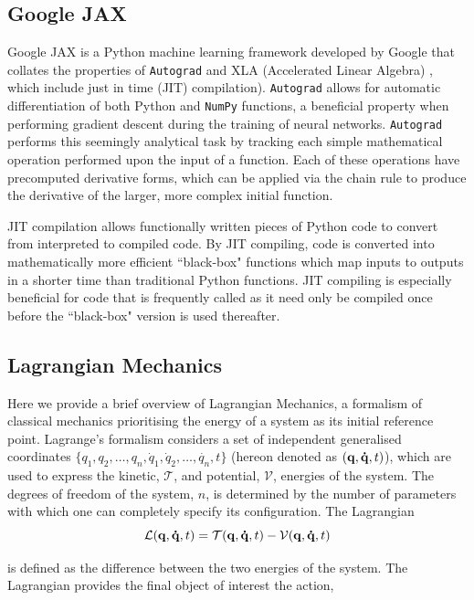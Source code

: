\documentclass[10pt]{iopart}
\begin{document}
\subsection{Google JAX}
Google JAX \cite{Jax} is a Python machine learning framework developed by Google that collates the properties of \texttt{Autograd} \cite{Autograd} and XLA (Accelerated Linear Algebra) \cite{XLA}, which include just in time (JIT) compilation). \texttt{Autograd} allows for automatic differentiation of both Python and \texttt{NumPy} functions, a beneficial property when performing gradient descent during the training of neural networks. \texttt{Autograd} performs this seemingly analytical task by tracking each simple mathematical operation performed upon the input of a function. Each of these operations have precomputed derivative forms, which can be applied via the chain rule to produce the derivative of the larger, more complex initial function.  

JIT compilation allows functionally written pieces of Python code to convert from interpreted to compiled code. By JIT compiling, code is converted into mathematically more efficient ``black-box" functions which map inputs to outputs in a shorter time than traditional Python functions. JIT compiling is especially beneficial for code that is frequently called as it need only be compiled once before the ``black-box" version is used thereafter.

\subsection{Lagrangian Mechanics}
Here we provide a brief overview of Lagrangian Mechanics, a formalism of classical mechanics prioritising the energy of a system as its initial reference point.
Lagrange's formalism considers a set of independent generalised coordinates $\{q_1,q_2,\ldots,q_n,\dot{q}_1,\dot{q}_2,\ldots,\dot{q_n},t\}$ (hereon denoted as  $(\bold{q},\bold{\dot{q}},t)$), which are used to express the kinetic, $\mathcal{T}$, and potential, $\mathcal{V}$, energies of the system. The degrees of freedom of the system, $n$, is determined by the number of parameters with which one can completely specify its configuration. The Lagrangian 
\begin{equation}
	\mathcal{L}(\bold{q},\bold{\dot{q}},t) = \mathcal T(\bold{q},\bold{\dot{q}},t) - \mathcal V(\bold{q},\bold{\dot{q}},t)
\end{equation}

\noindent is defined as the difference between the two energies of the system. The Lagrangian provides the final object of interest the action, 
\end{document}
